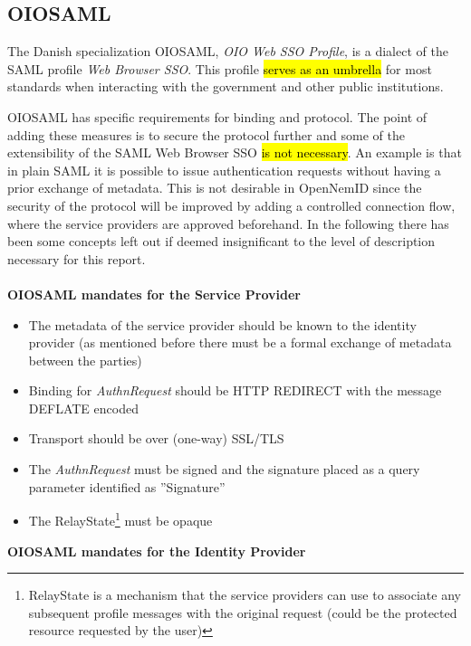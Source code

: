 \documentclass[twosided]{report}
\begin{document}
\subsection{OIOSAML}
The Danish specialization OIOSAML, \emph{OIO Web SSO Profile}, is a dialect of the SAML profile \emph{Web Browser SSO}. This profile \hl{serves as an umbrella} for most standards when interacting with the government and other public institutions.
\par
OIOSAML has specific requirements for binding and protocol. The point of adding these measures is to secure the protocol further and some of the extensibility of the SAML Web Browser SSO \hl{is not necessary}. An example is that in plain SAML it is possible to issue authentication requests without having a prior exchange of metadata. This is not desirable in OpenNemID since the security of the protocol will be improved by adding a controlled connection flow, where the service providers are approved beforehand. In the following there has been some concepts left out if deemed insignificant to the level of description necessary for this report.\\\\
\textbf{OIOSAML mandates for the Service Provider}
\begin{itemize}
  \item The metadata of the service provider should be known to the identity provider (as mentioned before there must be a formal exchange of metadata between the parties)
  \item Binding for \emph{AuthnRequest} should be HTTP REDIRECT with the message DEFLATE encoded
  \item Transport should be over (one-way) SSL/TLS
  \item The \emph{AuthnRequest} must be signed and the signature placed as a query parameter identified as ''Signature''
  \item The RelayState\footnote{RelayState is a mechanism that the service providers can use to associate any subsequent profile messages with the original request (could be the protected resource requested by the user)} must be opaque
\end{itemize}
\textbf{OIOSAML mandates for the Identity Provider}
\end{document}

